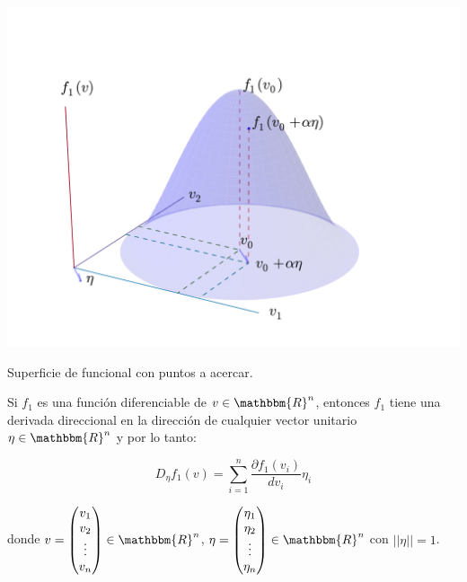                 \begin{marginfigure}
                    \centering
                    \includegraphics[width=\textwidth]{./imagenes/superficie3d.pdf}
                    \caption{\label{fig:superficie3d}Superficie de funcional con puntos a acercar.}
                \end{marginfigure}

                \begin{teorema}
                    Si $f_1$ es una función diferenciable de $v \in \mathbbm{R}^n$, entonces $f_1$ tiene una derivada direccional en la dirección de cualquier vector unitario $\eta \in \mathbbm{R}^n$ y por lo tanto:

                    \begin{equation}
                        D_{\eta} f_1(v) = \sum_{i=1}^n \frac{\partial f_1(v_i)}{dv_i} \eta_i
                    \end{equation}

                    donde $v = \begin{pmatrix} v_1 \\ v_2 \\ \vdots \\ v_n \end{pmatrix} \in \mathbbm{R}^n$, $\eta = \begin{pmatrix} \eta_1 \\ \eta_2 \\ \vdots \\ \eta_n \end{pmatrix} \in \mathbbm{R}^n$ con $|| \eta || = 1$.
                \end{teorema}

